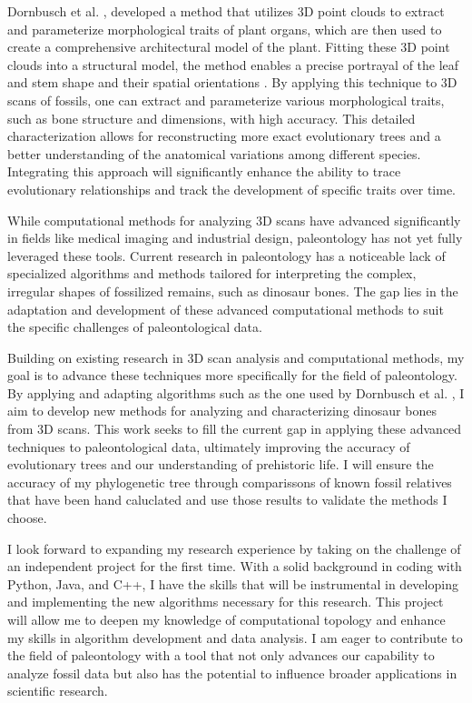 \documentclass[12pt]{article}
\begin{document}
Dornbusch et al. \cite{dornbusch2007}, developed a method that utilizes 3D point 
clouds to extract and parameterize morphological traits of plant organs, which 
are then used to create a comprehensive architectural model of the plant. Fitting 
these 3D point clouds into a structural model, the method enables a precise 
portrayal of the leaf and stem shape and their spatial orientations \citep{dornbusch2007}. 
By applying this technique to 3D scans of fossils, one can extract and parameterize 
various morphological traits, such as bone structure and dimensions, with high 
accuracy. This detailed characterization allows for reconstructing more exact
evolutionary trees and a better understanding of the anatomical variations among
different species. Integrating this approach will significantly enhance the
ability to trace evolutionary relationships and track the development of
specific traits over time. 

While computational methods for analyzing 3D scans have advanced significantly
in fields like medical imaging and industrial design, paleontology has not yet
fully leveraged these tools. Current research in paleontology has a noticeable lack of
specialized algorithms and methods tailored for interpreting the complex,
irregular shapes of fossilized remains, such as dinosaur bones. The gap lies in
the adaptation and development of these advanced computational methods to suit
the specific challenges of paleontological data.

Building on existing research in 3D scan analysis and computational methods, my
goal is to advance these techniques more specifically for the field of
paleontology. By applying and adapting algorithms such as the one used by
Dornbusch et al. \citep{dornbusch2007}, I aim to develop new methods for analyzing 
and characterizing dinosaur bones from 3D scans. This work seeks to fill the 
current gap in applying these advanced techniques to paleontological data, 
ultimately improving the accuracy of evolutionary trees and our understanding of 
prehistoric life. I will ensure the accuracy of my phylogenetic tree through
comparissons of known fossil relatives that have been hand caluclated and use
those results to validate the methods I choose.

I look forward to expanding my research experience by taking on the challenge of
an independent project for the first time. With a solid background in
coding with Python, Java, and C++, I have the skills that will be instrumental 
in developing and implementing the new algorithms necessary for this research. 
This project will allow me to deepen my knowledge of computational topology and 
enhance my skills in algorithm development and data analysis. I am eager to 
contribute to the field of paleontology with a tool that not only advances our 
capability to analyze fossil data but also has the potential to influence broader 
applications in scientific research.
\end{document}
